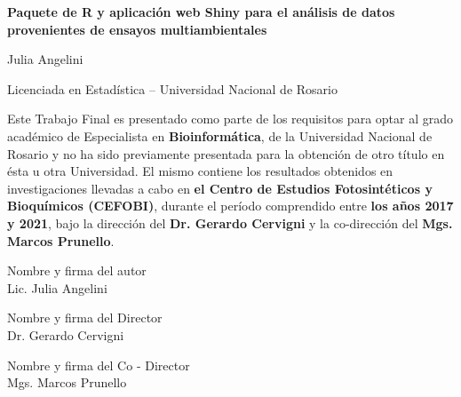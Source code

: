
\begin{center}
\textbf{\Large{Paquete de R y aplicación web Shiny para el análisis de datos provenientes de ensayos multiambientales}}
\end{center}

\vspace{1.5cm}

\begin{center}
Julia Angelini

\vspace{0.5cm}
Licenciada en Estadística – Universidad Nacional de Rosario
\end{center}
\vspace{1.5cm}
Este Trabajo Final es presentado como parte de los requisitos para optar al grado académico de Especialista en \textbf{Bioinformática}, de la Universidad Nacional de Rosario y no ha sido previamente presentada para la obtención de otro título en ésta u otra Universidad. El mismo contiene los resultados obtenidos en investigaciones llevadas a cabo en \textbf{el Centro de Estudios Fotosintéticos y Bioquímicos (CEFOBI)}, durante el período comprendido entre \textbf{los años 2017 y 2021}, bajo la dirección del \textbf{Dr. Gerardo Cervigni} y la co-dirección del \textbf{Mgs. Marcos Prunello}.  

\vspace{1.25cm}
Nombre y firma del autor\\
\vspace{0.05cm}
\hspace{0.95cm}Lic. Julia Angelini

\vspace{1.25cm}
Nombre y firma del Director\\
\vspace{0.05cm}
\hspace{0.95cm}Dr. Gerardo Cervigni
 
\vspace{1.25cm}
Nombre y firma del Co - Director\\
\vspace{0.05cm}
\hspace{1.3cm}Mgs. Marcos Prunello
\vspace{1.85cm}




